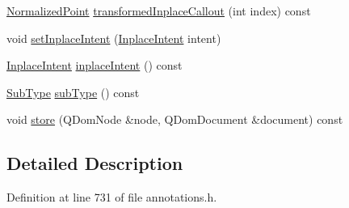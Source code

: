 \begin{DoxyCompactItemize}
\item 
\hyperlink{classOkular_1_1NormalizedPoint}{Normalized\+Point} \hyperlink{classOkular_1_1TextAnnotation_acbdb084e6d9972db6aa792b21e0c51f2}{transformed\+Inplace\+Callout} (int index) const 
\item 
void \hyperlink{classOkular_1_1TextAnnotation_af690ccd6d4f35448e4078ad6c85c914f}{set\+Inplace\+Intent} (\hyperlink{classOkular_1_1TextAnnotation_a6494ecc81861c6b3da81aa98a3cd16c5}{Inplace\+Intent} intent)
\item 
\hyperlink{classOkular_1_1TextAnnotation_a6494ecc81861c6b3da81aa98a3cd16c5}{Inplace\+Intent} \hyperlink{classOkular_1_1TextAnnotation_acfa4831c8980e50dc0a47742659a5a63}{inplace\+Intent} () const 
\item 
\hyperlink{classOkular_1_1Annotation_af71b46e37d5f850b97d5c4de3be9aac0}{Sub\+Type} \hyperlink{classOkular_1_1TextAnnotation_a9268a7f168ab8bab5ffba1d6bd4f5b32}{sub\+Type} () const 
\item 
void \hyperlink{classOkular_1_1TextAnnotation_a8f2181033c78541d4fdd02d2e37549da}{store} (Q\+Dom\+Node \&node, Q\+Dom\+Document \&document) const 
\end{DoxyCompactItemize}


\subsection{Detailed Description}


Definition at line 731 of file annotations.\+h.



